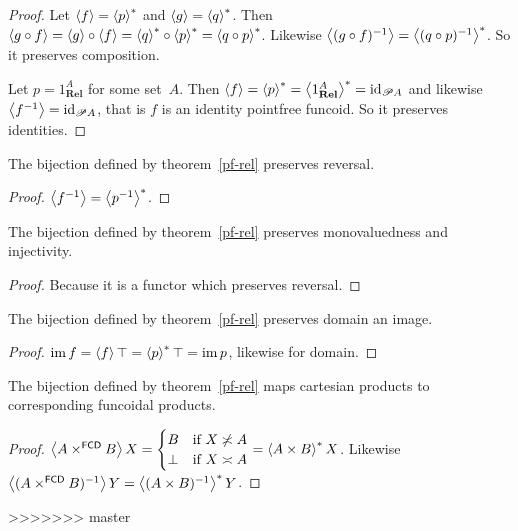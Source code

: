 \begin{proof}
Let $\left\langle f\right\rangle=\left\langle p\right\rangle ^{\ast}$ and $\left\langle g\right\rangle=\left\langle q\right\rangle ^{\ast}$. Then $\left\langle g\circ f\right\rangle=\left\langle g\right\rangle\circ\left\langle f\right\rangle=\left\langle q\right\rangle ^{\ast}\circ\left\langle p\right\rangle ^{\ast}=\left\langle q\circ p\right\rangle ^{\ast}$.
Likewise $\left\langle (g\circ f)^{-1}\right\rangle=\left\langle (q\circ p)^{-1}\right\rangle ^{\ast}$. So
it preserves composition.

Let $p=1_{\mathbf{Rel}}^{A}$ for some set~$A$. Then $\left\langle f\right\rangle=\left\langle p\right\rangle ^{\ast}=\left\langle 1_{\mathbf{Rel}}^{A}\right\rangle ^{\ast}={\operatorname{id}}_{\mathscr{P} A}$
and likewise $\left\langle f^{-1}\right\rangle={\operatorname{id}}_{\mathscr{P} A}$, that is $f$ is
an identity pointfree funcoid. So it preserves identities.\end{proof}
\begin{prop}
The bijection defined by theorem~\ref{pf-rel} preserves reversal.\end{prop}
\begin{proof}
$\left\langle f^{-1}\right\rangle=\left\langle p^{-1}\right\rangle ^{\ast}$.\end{proof}
\begin{prop}
The bijection defined by theorem~\ref{pf-rel} preserves monovaluedness
and injectivity.\end{prop}
\begin{proof}
Because it is a functor which preserves reversal.\end{proof}
\begin{prop}
The bijection defined by theorem~\ref{pf-rel} preserves domain
an image.\end{prop}
\begin{proof}
$\operatorname{im} f=\left\langle f\right\rangle\top=\left\langle p\right\rangle ^{\ast}\top=\operatorname{im} p$, likewise for domain.\end{proof}
\begin{prop}
The bijection defined by theorem~\ref{pf-rel} maps cartesian
products to corresponding funcoidal products.\end{prop}
\begin{proof}
$\left\langle A\times^{\mathsf{FCD}}B\right\rangle X=\begin{cases}
B & \text{if }X\not\asymp A\\
\bot & \text{if }X\asymp A
\end{cases}=\left\langle A\times B\right\rangle ^{\ast}X$. Likewise $\left\langle (A\times^{\mathsf{FCD}}B)^{-1}\right\rangle Y=\left\langle (A\times B)^{-1}\right\rangle ^{\ast}Y$.\end{proof}

>>>>>>> master
